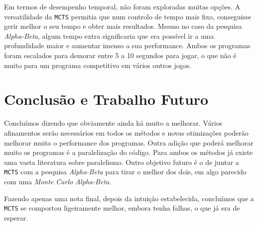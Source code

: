 \documentclass[12pt,a4paper,oneside]{article}
\begin{document}
Em termos de desempenho temporal, não foram exploradas muitas
opções. A versatilidade da \texttt{MCTS} permitia que num controlo de
tempo mais fixo, conseguisse gerir melhor o seu tempo e obter mais
resultados. Mesmo no caso da pesquisa \textit{Alpha-Beta}, algum tempo
extra significaria que era possível ir a uma profundidade maior e
aumentar imenso a sua performance. Ambos os programas foram escalados
para demorar entre 5 a 10 segundos para jogar, o que não é muito para
um programa competitivo em vários outros jogos.


\section{Conclusão e Trabalho Futuro}
\label{sec:conc}


Concluímos dizendo que obviamente ainda há muito a melhorar. Vários
afinamentos serão necessários em todos os métodos e novas otimizações
poderão melhorar muito o performance dos programas. Outra adição que
poderá melhorar muito os programas é a paralelização do código. Para
ambos os métodos já existe uma vasta literatura sobre
paralelismo. Outro objetivo futuro é o de juntar a \texttt{MCTS} com a
pesquisa \textit{Alpha-Beta} para tirar o melhor dos dois, em algo
parecido com uma \textit{Monte Carlo Alpha-Beta}.

Fazendo apenas uma nota final, depois da intuição estabelecida,
concluímos que a \texttt{MCTS} se comportou ligeiramente melhor,
embora tenha falhas, o que já era de esperar.



\end{document}
